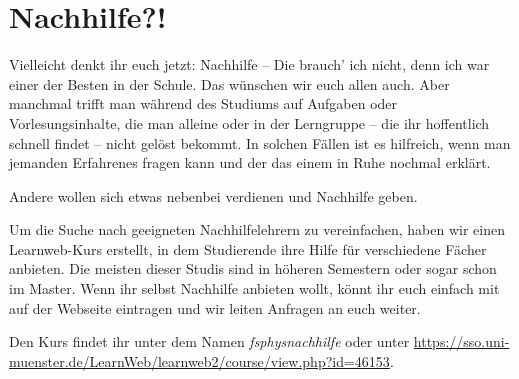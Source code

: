 \section{Nachhilfe?!}
\begin{multicols}{2}
Vielleicht denkt ihr euch jetzt: Nachhilfe -- Die brauch' ich nicht, denn ich war einer der Besten in der Schule. Das wünschen wir euch allen auch. Aber manchmal trifft man während des Studiums auf Aufgaben oder Vorlesungsinhalte, die man alleine oder in der Lerngruppe -- die ihr hoffentlich schnell findet -- nicht gelöst bekommt. In solchen Fällen ist es hilfreich, wenn man jemanden Erfahrenes fragen kann und der das einem in Ruhe nochmal erklärt.

Andere wollen sich etwas nebenbei verdienen und Nachhilfe geben.

Um die Suche nach geeigneten Nachhilfelehrern zu vereinfachen, haben wir einen Learnweb-Kurs erstellt, in dem Studierende ihre Hilfe für verschiedene Fächer anbieten. Die meisten dieser Studis sind in höheren Semestern oder sogar schon im Master. Wenn ihr selbst Nachhilfe  anbieten wollt, könnt ihr euch einfach mit auf der Webseite eintragen und wir leiten Anfragen an euch weiter.

Den Kurs findet ihr unter dem Namen \textit{fsphysnachhilfe} oder unter \url{https://sso.uni-muenster.de/LearnWeb/learnweb2/course/view.php?id=46153}.

\end{multicols}
